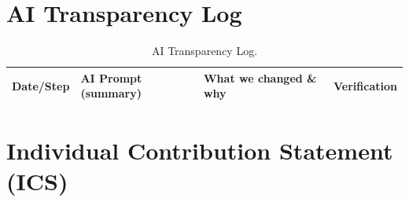 \documentclass[11pt]{article}
\begin{document}
\newpage
\appendix

\section{AI Transparency Log}
\begin{table}[h]
\centering
\small
\begin{tabular}{@{}p{2.5cm}p{4cm}p{4cm}p{3cm}@{}}
\toprule
Date/Step & AI Prompt (summary) & What we changed \& why & Verification \\
\midrule
\bottomrule
\end{tabular}
\caption{AI Transparency Log.}
\end{table}

\section{Individual Contribution Statement (ICS)}

% 
% 
\end{document}
